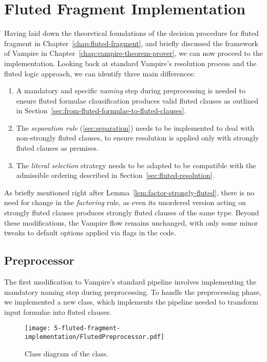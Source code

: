 \chapter{Fluted Fragment Implementation}\label{chap:fluted-fragment-implementation}

Having laid down the theoretical foundations of the decision procedure for fluted fragment in Chapter~\ref{chap:fluted-fragment}, and briefly discussed the framework of Vampire in Chapter~\ref{chap:vampire-theorem-prover}, we can now proceed to the implementation.
Looking back at standard Vampire's resolution process and the fluted logic approach, we can identify three main differences:
\begin{enumerate}
  \item A mandatory and specific \emph{naming} step during preprocessing is needed to ensure fluted formulae clausification produces valid fluted clauses as outlined in Section~\ref{sec:from-fluted-formulae-to-fluted-clauses}.
  \item The \emph{separation rule} (\ref{sec:separation}) needs to be implemented to deal with non-strongly fluted clauses, to ensure resolution is applied only with strongly fluted clauses as premises.
  \item The \emph{literal selection} strategy needs to be adapted to be compatible with the admissible ordering described in Section~\ref{sec:fluted-resolution}.
\end{enumerate}

As briefly mentioned right after Lemma~\ref{lem:factor-strongly-fluted}, there is no need for change in the \emph{factoring} rule, as even its unordered version acting on strongly fluted clauses produces strongly fluted clauses of the same type.
Beyond these modifications, the Vampire flow remains unchanged, with only some minor tweaks to default options applied via flags in the code.


\section{Preprocessor}\label{sec:preprocessor}

The first modification to Vampire's standard pipeline involves implementing the mandatory naming step during preprocessing. 
To handle the preprocessing phase, we implemented a new  class, which implements the pipeline needed to transform input formulae into fluted clauses.

\begin{figure}[H]
  \centering
  \texttt{[image: 5-fluted-fragment-implementation/FlutedPreprocessor.pdf]}
  \caption{Class diagram of the  class.}\label{fig:fluted-preprocessor-class-diagram}
\end{figure}


